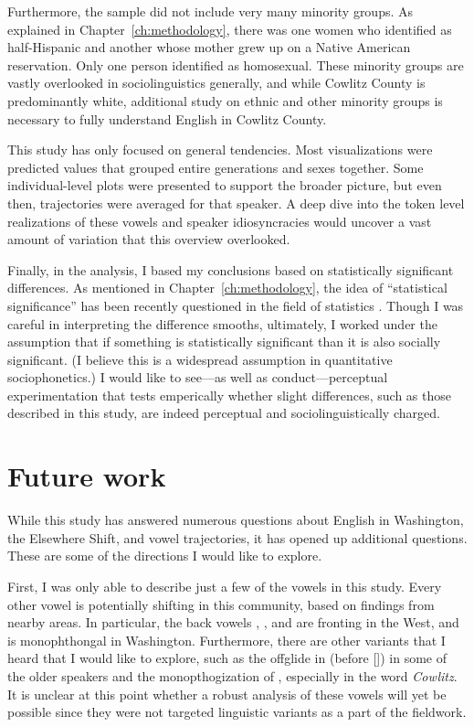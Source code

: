Furthermore, the sample did not include very many minority groups. As explained in Chapter~\ref{ch:methodology}, there was one women who identified as half-Hispanic and another whose mother grew up on a Native American reservation. Only one person identified as homosexual. These minority groups are vastly overlooked in sociolinguistics generally, and while Cowlitz County is predominantly white, additional study on ethnic and other minority groups is necessary to fully understand English in Cowlitz County.

This study has only focused on general tendencies. Most visualizations were predicted values that grouped entire generations and sexes together. Some individual-level plots were presented to support the broader picture, but even then, trajectories were averaged for that speaker. A deep dive into the token level realizations of these vowels and speaker idiosyncracies would uncover a vast amount of variation that this overview overlooked.

Finally, in the analysis, I based my conclusions based on statistically significant differences. As mentioned in Chapter~\ref{ch:methodology}, the idea of ``statistical significance'' has been recently questioned in the field of statistics \citep{wasserstein_etal_2019}. Though I was careful in interpreting the difference smooths, ultimately, I worked under the assumption that if something is statistically significant than it is also socially significant. (I believe this is a widespread assumption in quantitative sociophonetics.) I would like to see---as well as conduct---perceptual experimentation that tests emperically whether slight differences, such as those described in this study, are indeed perceptual and sociolinguistically charged.





\section{Future work} %

While this study has answered numerous questions about English in Washington, the Elsewhere Shift, and vowel trajectories, it has opened up additional questions. These are some of the directions I would like to explore.

First, I was only able to describe just a few of the vowels in this study. Every other vowel is potentially shifting in this community, based on findings from nearby areas. In particular, the back vowels \goose, \foot, and \goat are fronting in the West, and \face is monophthongal in Washington. Furthermore, there are other variants that I heard that I would like to explore, such as the offglide in \bash (\trap before []) in some of the older speakers and the monopthogization of \mouth, especially in the word \textit{Cowlitz}. It is unclear at this point whether a robust analysis of these vowels will yet be possible since they were not targeted linguistic variants as a part of the fieldwork.

